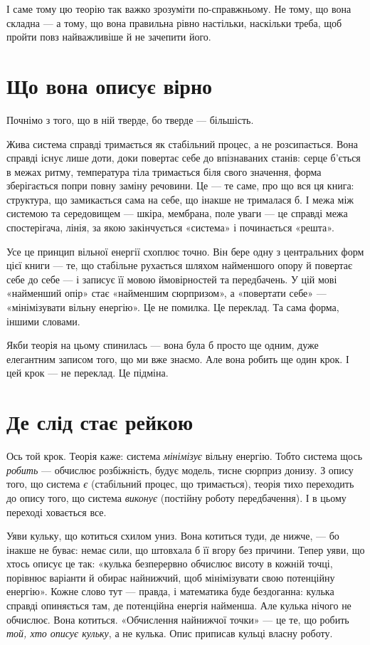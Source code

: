 \documentclass[12pt, a4paper, openany]{book}
\begin{document}
І саме тому цю теорію так важко зрозуміти по-справжньому. Не тому, що вона складна --- а тому, що вона правильна рівно настільки, наскільки треба, щоб пройти повз найважливіше й не зачепити його.

\section{Що вона описує вірно}

Почнімо з того, що в ній тверде, бо тверде --- більшість.

Жива система справді тримається як стабільний процес, а не розсипається. Вона справді існує лише доти, доки повертає себе до впізнаваних станів: серце б'ється в межах ритму, температура тіла тримається біля свого значення, форма зберігається попри повну заміну речовини. Це --- те саме, про що вся ця книга: структура, що замикається сама на себе, що інакше не трималася б. І межа між системою та середовищем --- шкіра, мембрана, поле уваги --- це справді межа спостерігача, лінія, за якою закінчується «система» і починається «решта».

Усе це принцип вільної енергії схоплює точно. Він бере одну з центральних форм цієї книги --- те, що стабільне рухається шляхом найменшого опору й повертає себе до себе --- і записує її мовою ймовірностей та передбачень. У цій мові «найменший опір» стає «найменшим сюрпризом», а «повертати себе» --- «мінімізувати вільну енергію». Це не помилка. Це переклад. Та сама форма, іншими словами.

Якби теорія на цьому спинилась --- вона була б просто ще одним, дуже елегантним записом того, що ми вже знаємо. Але вона робить ще один крок. І цей крок --- не переклад. Це підміна.

\section{Де слід стає рейкою}

Ось той крок. Теорія каже: система \emph{мінімізує} вільну енергію. Тобто система щось \emph{робить} --- обчислює розбіжність, будує модель, тисне сюрприз донизу. З опису того, що система \emph{є} (стабільний процес, що тримається), теорія тихо переходить до опису того, що система \emph{виконує} (постійну роботу передбачення). І в цьому переході ховається все.

Уяви кульку, що котиться схилом униз. Вона котиться туди, де нижче, --- бо інакше не буває: немає сили, що штовхала б її вгору без причини. Тепер уяви, що хтось описує це так: «кулька безперервно обчислює висоту в кожній точці, порівнює варіанти й обирає найнижчий, щоб мінімізувати свою потенційну енергію». Кожне слово тут --- правда, і математика буде бездоганна: кулька справді опиняється там, де потенційна енергія найменша. Але кулька нічого не обчислює. Вона котиться. «Обчислення найнижчої точки» --- це те, що робить \emph{той, хто описує кульку}, а не кулька. Опис приписав кульці власну роботу.
\end{document}
